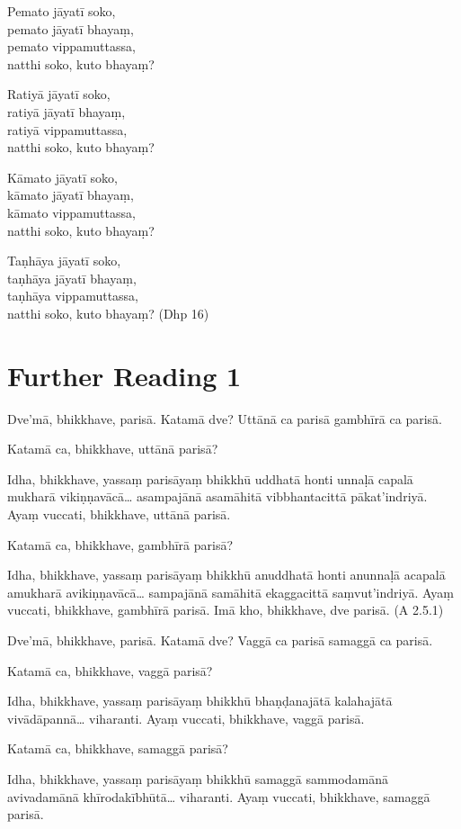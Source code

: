 Pemato jāyatī soko,\\
pemato jāyatī bhayaṃ,\\
pemato vippamuttassa,\\
natthi soko, kuto bhayaṃ?

Ratiyā jāyatī soko,\\
ratiyā jāyatī bhayaṃ,\\
ratiyā vippamuttassa,\\
natthi soko, kuto bhayaṃ?

Kāmato jāyatī soko,\\
kāmato jāyatī bhayaṃ,\\
kāmato vippamuttassa,\\
natthi soko, kuto bhayaṃ?

Taṇhāya jāyatī soko,\\
taṇhāya jāyatī bhayaṃ,\\
taṇhāya vippamuttassa,\\
natthi soko, kuto bhayaṃ? (Dhp 16)

\section*{Further Reading 1}

Dve’mā, bhikkhave, parisā. Katamā dve? Uttānā ca parisā gambhīrā ca parisā.

Katamā ca, bhikkhave, uttānā parisā?

Idha, bhikkhave, yassaṃ parisāyaṃ bhikkhū uddhatā honti unnaḷā capalā mukharā vikiṇṇavācā… asampajānā asamāhitā vibbhantacittā pākat’indriyā. Ayaṃ vuccati, bhikkhave, uttānā parisā.

Katamā ca, bhikkhave, gambhīrā parisā?

Idha, bhikkhave, yassaṃ parisāyaṃ bhikkhū anuddhatā honti anunnaḷā acapalā amukharā avikiṇṇavācā… sampajānā samāhitā ekaggacittā saṃvut’indriyā. Ayaṃ vuccati, bhikkhave, gambhīrā parisā. Imā kho, bhikkhave, dve parisā. (A 2.5.1)

Dve’mā, bhikkhave, parisā. Katamā dve? Vaggā ca parisā samaggā ca parisā.

Katamā ca, bhikkhave, vaggā parisā?

Idha, bhikkhave, yassaṃ parisāyaṃ bhikkhū bhaṇḍanajātā kalahajātā vivādāpannā… viharanti. Ayaṃ vuccati, bhikkhave, vaggā parisā.

Katamā ca, bhikkhave, samaggā parisā?

Idha, bhikkhave, yassaṃ parisāyaṃ bhikkhū samaggā sammodamānā avivadamānā khīrodakībhūtā… viharanti. Ayaṃ vuccati, bhikkhave, samaggā parisā.

